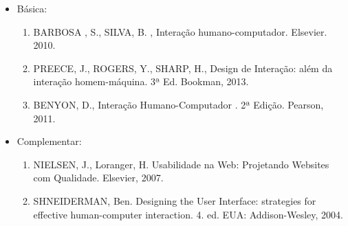 \begin{itemize}
  \item Básica:
	\begin{enumerate}
		\item BARBOSA , S., SILVA, B. , Interação humano-computador. Elsevier. 2010.
		\item PREECE, J., ROGERS, Y., SHARP, H., Design de Interação: além da interação homem-máquina. 3ª Ed. Bookman, 2013.
		\item BENYON, D., Interação Humano-Computador . 2ª Edição. Pearson, 2011.
	\end{enumerate}
  \item Complementar:
	\begin{enumerate} 
		\item NIELSEN, J., Loranger, H. Usabilidade na Web: Projetando Websites com Qualidade. Elsevier, 2007.
		\item SHNEIDERMAN, Ben. Designing the User Interface: strategies for effective human-computer interaction. 4. ed. EUA: Addison-Wesley, 2004.
	\end{enumerate}
\end{itemize}
